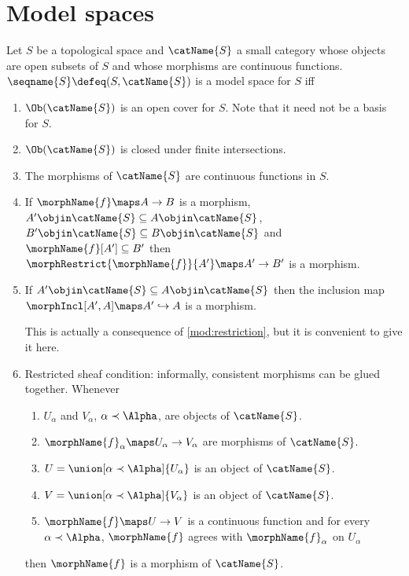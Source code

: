 \documentclass{article}
\begin{document}
\section{Model spaces}
\begin{definition}
\label{def:model}
Let $S$ be a topological space and $\catName{S}$ a small category whose
objects are open subsets of $S$ and whose morphisms are continuous
functions. $\seqname{S} \defeq (S, \catName{S})$ is a model space for
$S$ iff

\begin{enumerate}
\item $\Ob(\catName{S})$ is an open cover for $S$. Note that it need
not be a basis for $S$.
\label{mod:cover}
\item $\Ob(\catName{S})$ is closed under finite intersections.
\label{mod:closed}
\item The morphisms of $\catName{S}$ are continuous functions in $S$.
\label{mod:continuous}
\item If $\morphName{f} \maps A \to B$ is a morphism,
$A' \objin \catName{S} \subseteq A \objin \catName{S}$,
$B' \objin \catName{S} \subseteq B \objin \catName{S}$ and
\nobreaks
  {{
    $\morphName{f}[A'] \subseteq B'$
  }}
then
$\morphRestrict{\morphName{f}}{A'} \maps A' \to B'$ is a morphism.
\label{mod:restriction}
\item If $A' \objin \catName{S} \subseteq A \objin \catName{S}$ then
the inclusion map $\morphIncl[{A'},{A}] \maps A' \hookrightarrow A$ is a
morphism.
\label{mod:inclusion}
\begin{remark}
This is actually a consequence of \cref{mod:restriction},
but it is convenient to give it here.
\end{remark}
\item Restricted sheaf condition:
\label{mod:sheaf}
informally, consistent morphisms can be glued together. Whenever
\begin{enumerate}
\item $U_\alpha$ and $V_\alpha$, $\alpha \prec \Alpha$,
are objects of $\catName{S}$.
\item $\morphName{f}_\alpha \maps U_\alpha \to V_\alpha$ are morphisms of
$\catName{S}$.
\item
$U = \union[\alpha \prec \Alpha]{U_\alpha}$ is an object of $\catName{S}$.
\item
$V = \union[\alpha \prec \Alpha]{V_\alpha}$ is an object of $\catName{S}$.
\item
$\morphName{f} \maps U \to V$ is a continuous function and
for every $\alpha \prec \Alpha$,
$\morphName{f}$ agrees with $\morphName{f}_\alpha$ on $U_\alpha$
\end{enumerate}
then $\morphName{f}$ is a morphism of $\catName{S}$.
\end{enumerate}


\end{definition}
\end{document}
